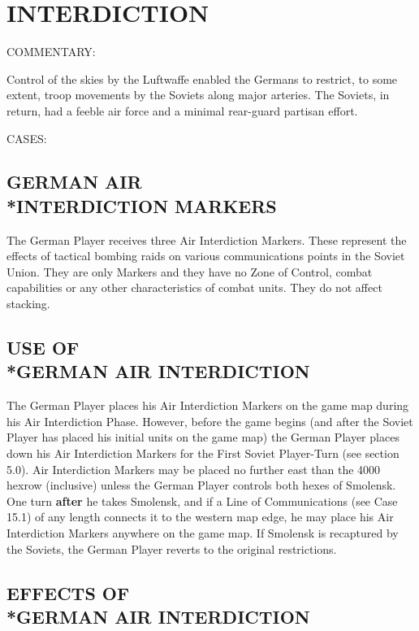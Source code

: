 \section{INTERDICTION}

COMMENTARY:

Control of the skies by the Luftwaffe enabled the Germans to restrict, to some extent, troop movements by the Soviets along major arteries. The Soviets, in return, had a feeble air force and a minimal rear-guard partisan effort.

CASES:

\subsection{GERMAN AIR\\*INTERDICTION MARKERS}

The German Player receives three Air Interdiction Markers. These represent the effects of tactical bombing raids on various communications points in the Soviet Union. They are only Markers and they have no Zone of Control, combat capabilities or any other characteristics of combat units. They do not affect stacking.

\subsection{USE OF\\*GERMAN AIR INTERDICTION}

The German Player places his Air Interdiction Markers on the game map during his Air Interdiction Phase. However, before the game begins (and after the Soviet Player has placed his initial units on the game map) the German Player places down his Air Interdiction Markers for the First Soviet Player-Turn (see section 5.0). Air Interdiction Markers may be placed no further east than the 4000 hexrow (inclusive) unless the German Player controls both hexes of Smolensk. One turn \textbf{after} he takes Smolensk, and if a Line of Communications (see Case 15.1) of any length connects it to the western map edge, he may place his Air Interdiction Markers anywhere on the game map. If Smolensk is recaptured by the Soviets, the German Player reverts to the original restrictions.

\subsection{EFFECTS OF\\*GERMAN AIR INTERDICTION}

